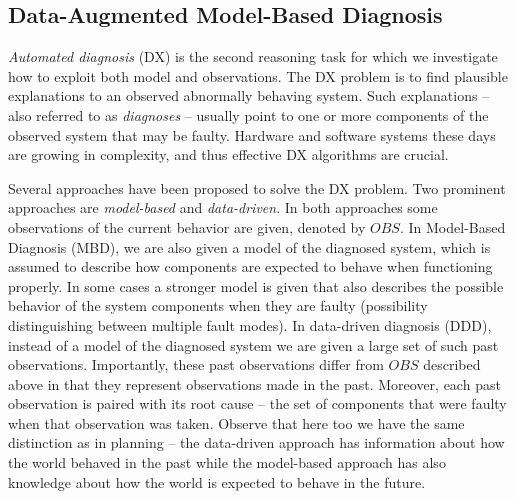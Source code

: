\documentclass[12pt]{article}
\begin{document}





\subsection{Data-Augmented Model-Based Diagnosis}


{\em Automated diagnosis} (DX) is the second reasoning task for which we investigate how to exploit both model and observations. The DX problem is to find plausible explanations to an observed abnormally behaving system. Such explanations -- also referred to as {\em diagnoses} -- usually point to one or more components of the observed system that may be faulty. 
Hardware and software systems these days are growing in complexity, and thus effective DX algorithms are crucial. 


Several approaches have been proposed to solve the DX problem. Two prominent approaches are {\em model-based} and {\em data-driven}. In both approaches some observations of the current behavior are given, denoted by $OBS$. In Model-Based Diagnosis (MBD), we are also given a model of the diagnosed system, which is assumed to describe how  components are expected to behave when functioning properly. In some cases a stronger model is given that also describes the possible behavior of the system components when they are faulty (possibility distinguishing between multiple fault modes). In data-driven diagnosis (DDD), instead of a model of the diagnosed system we are given a large set of such past observations. Importantly, these past observations differ from $OBS$ described above in that they represent observations made in the past. Moreover, each past observation is paired with its root cause -- the set of components that were faulty when that observation was taken. Observe that here too we have the same distinction as in planning -- the data-driven approach has information about how the world behaved in the past while the model-based approach has also knowledge about how the world is expected to behave in the future. 
\end{document}
